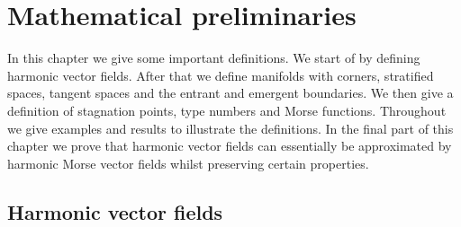 \chapter{Mathematical preliminaries}

In this chapter we give some important definitions. We start of by defining harmonic vector fields.
After that we define manifolds with corners, stratified spaces, tangent spaces and the entrant and emergent boundaries.
We then give a definition of stagnation points, type numbers and Morse functions. Throughout we give examples and results to illustrate the definitions.
In the final part of this chapter we prove that harmonic vector fields can essentially be approximated by harmonic Morse vector fields
whilst preserving certain properties.

\section{Harmonic vector fields}


